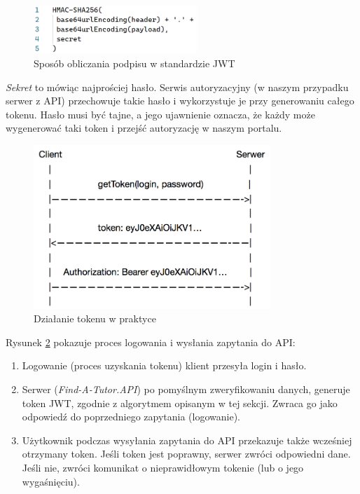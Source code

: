 \documentclass[12pt]{article}
\numberwithin{figure}{section}
\begin{document}
\begin{sloppypar}
    \begin{figure}[H] 
     	\centering
    	\includegraphics[width=0.55\textwidth]{images/chapter_3/jwt-signature.png}
    	\caption{Sposób obliczania podpisu w standardzie JWT}
    	\label{fig:jwt-signature}
    \end{figure}
    
    \textit{Sekret} to mówiąc najprościej hasło. Serwis autoryzacyjny (w naszym przypadku serwer z API) przechowuje takie hasło i wykorzystuje je przy generowaniu całego tokenu. Hasło musi być tajne, a jego ujawnienie oznacza, że każdy może wygenerować taki token i przejść autoryzację w naszym portalu.
    
    \begin{figure}[H] 
     	\centering
    	\includegraphics[width=0.8\textwidth]{images/chapter_3/token-diagram.png}
    	\caption{Działanie tokenu w praktyce \cite{token-diagram}}
    	\label{fig:token-diagram}
    \end{figure}
    
    Rysunek \ref{fig:token-diagram} pokazuje proces logowania i wysłania zapytania do API:
    \begin{enumerate}
        \item Logowanie (proces uzyskania tokenu) klient przesyła login i hasło.
        \item Serwer (\textit{Find-A-Tutor.API}) po pomyślnym zweryfikowaniu danych, generuje token JWT, zgodnie z algorytmem opisanym w tej sekcji. Zwraca go jako odpowiedź do poprzedniego zapytania (logowanie).
        \item Użytkownik podczas wysyłania zapytania do API przekazuje także wcześniej otrzymany token. Jeśli token jest poprawny, serwer zwróci odpowiedni dane. Jeśli nie, zwróci komunikat o nieprawidłowym tokenie (lub o jego wygaśnięciu).
    \end{enumerate}
    

\end{sloppypar}
\end{document}
